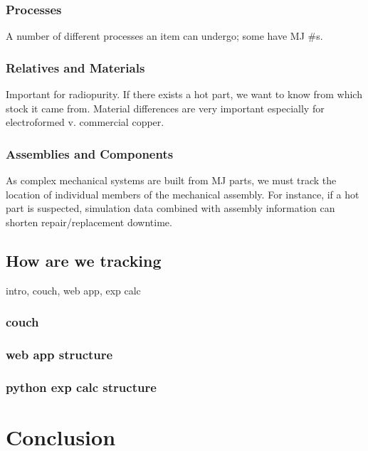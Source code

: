 \documentclass[journal]{IEEEtran}
\begin{document}
\subsubsection{Processes}
A number of different processes an item can undergo; some have MJ \#s.

\subsubsection{Relatives and Materials}
Important for radiopurity. If there exists a hot part, we want to know from which stock it came from. Material differences are very important especially for electroformed v. commercial copper.

\subsubsection{Assemblies and Components}
As complex mechanical systems are built from MJ parts, we must track the location of individual members of the mechanical assembly. For instance, if a hot part is suspected, simulation data combined with assembly information can shorten repair/replacement downtime.

\subsection{How are we tracking}
intro, couch, web app, exp calc

\subsubsection{couch}

\subsubsection{web app structure}

\subsubsection{python exp calc structure}

\section{Conclusion}
\end{document}
